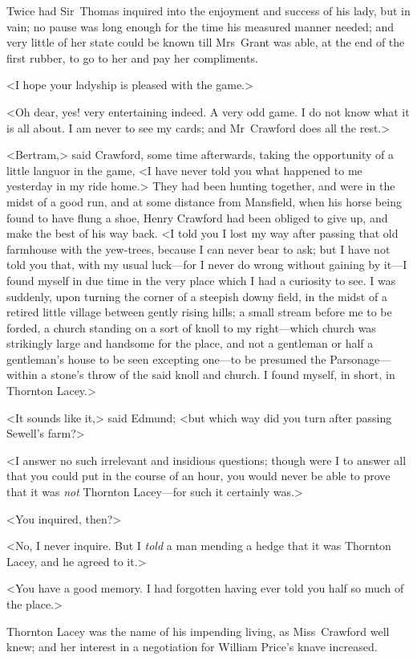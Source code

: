 Twice had Sir~Thomas inquired into the enjoyment and success of his lady, but in vain; no pause was long enough for the time his measured manner needed; and very little of her state could be known till Mrs~Grant was able, at the end of the first rubber, to go to her and pay her compliments.

<I hope your ladyship is pleased with the game.>

<Oh dear, yes! very entertaining indeed. A very odd game. I do not know what it is all about. I am never to see my cards; and Mr~Crawford does all the rest.>

<Bertram,> said Crawford, some time afterwards, taking the opportunity of a little languor in the game, <I have never told you what happened to me yesterday in my ride home.> They had been hunting together, and were in the midst of a good run, and at some distance from Mansfield, when his horse being found to have flung a shoe, Henry Crawford had been obliged to give up, and make the best of his way back. <I told you I lost my way after passing that old farmhouse with the yew-trees, because I can never bear to ask; but I have not told you that, with my usual luck—for I never do wrong without gaining by it—I found myself in due time in the very place which I had a curiosity to see. I was suddenly, upon turning the corner of a steepish downy field, in the midst of a retired little village between gently rising hills; a small stream before me to be forded, a church standing on a sort of knoll to my right—which church was strikingly large and handsome for the place, and not a gentleman or half a gentleman's house to be seen excepting one—to be presumed the Parsonage—within a stone's throw of the said knoll and church. I found myself, in short, in Thornton Lacey.>

<It sounds like it,> said Edmund; <but which way did you turn after passing Sewell's farm?>

<I answer no such irrelevant and insidious questions; though were I to answer all that you could put in the course of an hour, you would never be able to prove that it was \textit{not}  Thornton Lacey—for such it certainly was.>

<You inquired, then?>

<No, I never inquire. But I \textit{told}  a man mending a hedge that it was Thornton Lacey, and he agreed to it.>

<You have a good memory. I had forgotten having ever told you half so much of the place.>

Thornton Lacey was the name of his impending living, as Miss~Crawford well knew; and her interest in a negotiation for William Price's knave increased.

